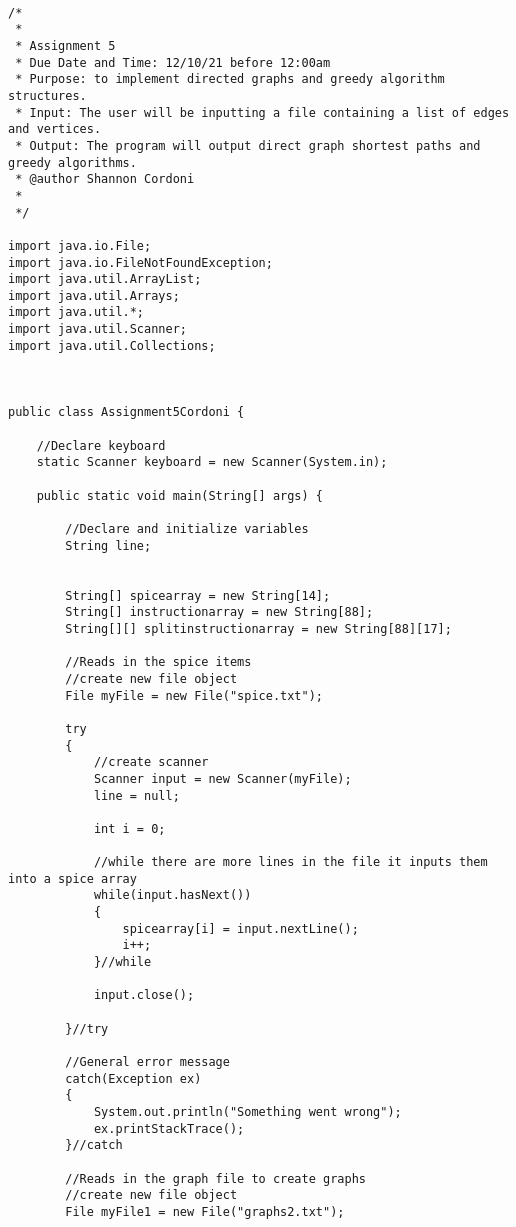 \documentclass[letterpaper, 10pt,DIV=13]{scrartcl}
\numberwithin{equation}{section} %
\numberwithin{figure}{section} %
\numberwithin{table}{section} %
\begin{document}
\lstset{numbers=left, numberstyle=\tiny, stepnumber=1, numbersep=5pt, basicstyle=\footnotesize\ttfamily}
\begin{lstlisting}[frame=single, ] 
   
/*
 * 
 * Assignment 5
 * Due Date and Time: 12/10/21 before 12:00am 
 * Purpose: to implement directed graphs and greedy algorithm structures.
 * Input: The user will be inputting a file containing a list of edges and vertices. 
 * Output: The program will output direct graph shortest paths and greedy algorithms. 
 * @author Shannon Cordoni 
 * 
 */

import java.io.File;
import java.io.FileNotFoundException;
import java.util.ArrayList;
import java.util.Arrays;
import java.util.*;
import java.util.Scanner;
import java.util.Collections;



public class Assignment5Cordoni {

    //Declare keyboard 
    static Scanner keyboard = new Scanner(System.in);
    
    public static void main(String[] args) {

        //Declare and initialize variables 
        String line;


        String[] spicearray = new String[14];
        String[] instructionarray = new String[88];
        String[][] splitinstructionarray = new String[88][17];

        //Reads in the spice items 
        //create new file object
        File myFile = new File("spice.txt");
        
        try
        {
            //create scanner
            Scanner input = new Scanner(myFile);
            line = null;
            
            int i = 0;

            //while there are more lines in the file it inputs them into a spice array
            while(input.hasNext())
            {  
                spicearray[i] = input.nextLine();       
                i++;
            }//while

            input.close();  

        }//try

        //General error message
        catch(Exception ex)
        {
            System.out.println("Something went wrong");
            ex.printStackTrace();
        }//catch

        //Reads in the graph file to create graphs 
        //create new file object
        File myFile1 = new File("graphs2.txt");
        

\end{lstlisting}
\end{document}

